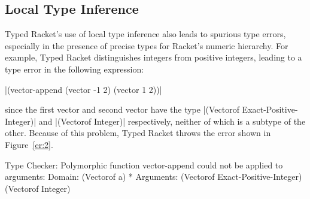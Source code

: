 
\subsection*{Local Type Inference}
Typed Racket's use of local type inference also leads to spurious type
errors, especially in the presence of precise types for Racket's numeric
hierarchy. For example, Typed Racket distinguishes integers from
positive integers, leading to a type error in the following expression:
\begin{center}
  \scheme|(vector-append (vector -1 2) (vector 1 2))|
\end{center}

\noindent
since the first vector and second vector have the type \scheme|(Vectorof
Exact-Positive-Integer)| and \scheme|(Vectorof Integer)| respectively,
neither of which is a subtype of the other. Because of this problem,
Typed Racket throws the error shown in Figure~\ref{er:2}.

\begin{figure*}
\begin{plain}
  \begin{schemedisplay}
Type Checker: Polymorphic function vector-append could not be applied to arguments:
Domain: (Vectorof a) *
Arguments: (Vectorof Exact-Positive-Integer) (Vectorof Integer)
  \end{schemedisplay}
\end{plain}
\caption{Type Error: \emph{vector-append}}
\label{er:2}
\end{figure*}

